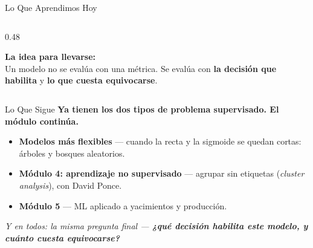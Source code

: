 \documentclass[aspectratio=169, 11pt]{beamer}
\begin{document}
\begin{frame}{Lo Que Aprendimos Hoy}
\begin{columns}[T]
\begin{column}{0.48\textwidth}
{\begin{itemize}
      \end{itemize}
      }
      \vspace{8pt}
      \begin{tcolorbox}[colback=arcaGray, colframe=arcaRed, boxrule=0pt, leftrule=3pt,
        arc=3pt, left=6pt, right=6pt, top=5pt, bottom=5pt]
        {\scriptsize\color{arcaDark}\bfseries La idea para llevarse:}\\[3pt]
        {\scriptsize\color{textMuted}
          Un modelo no se evalúa con una métrica.
          Se evalúa con \textbf{la decisión que habilita}
          y \textbf{lo que cuesta equivocarse}.}
      \end{tcolorbox}
    \end{column}
  \end{columns}
\end{frame}

\begin{frame}{Lo Que Sigue}
  \vspace{-6pt}
  {\small\color{arcaDark}\bfseries
    Ya tienen los dos tipos de problema supervisado. El módulo continúa.}

  \vspace{10pt}
  {\footnotesize
  \begin{itemize}\setlength{\itemsep}{7pt}
    \item[{\color{arcaRed}\Large\faArrowCircleRight}]
      \textbf{Modelos más flexibles} --- cuando la recta y la sigmoide
      se quedan cortas: árboles y bosques aleatorios.

    \item[{\color{arcaRed}\Large\faArrowCircleRight}]
      \textbf{Módulo 4: aprendizaje no supervisado} ---
      agrupar sin etiquetas (\textit{cluster analysis}), con David Ponce.

    \item[{\color{arcaRed}\Large\faArrowCircleRight}]
      \textbf{Módulo 5} --- ML aplicado a yacimientos y producción.
  \end{itemize}
  }

  \vspace{10pt}
  \centering
  {\footnotesize\color{arcaDark}\itshape
    Y en todos: la misma pregunta final --- \textbf{¿qué decisión habilita este modelo,
    y cuánto cuesta equivocarse?}}
\end{frame}
\end{document}
